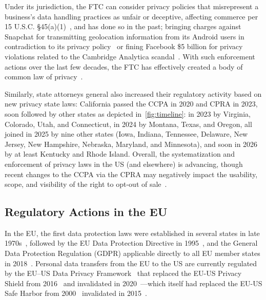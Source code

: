 Under its jurisdiction, the FTC can consider privacy policies that misrepresent a business's data handling practices as unfair or deceptive, affecting commerce per 15 U.S.C. §45(a)(1)~\cite{unitedstates:congress:houseofrepresentatives:officeofthelawrevisioncounselUnfairMethodsCompetition2023}, and has done so in the past; bringing charges against Snapchat for transmitting geolocation information from its Android users in contradiction to its privacy policy~\cite{ftcSnapchatSettlesFTC2014} or fining Facebook \$5 billion for privacy violations related to the Cambridge Analytica scandal~\cite{FTCImposes52019}. With such enforcement actions over the last few decades, the FTC has effectively created a body of common law of privacy~\cite{soloveFTCNewCommon2013}.  

Similarly, state attorneys general also increased their regulatory activity based on new privacy state laws: California passed the CCPA in 2020 and CPRA in 2023, soon followed by other states as depicted in~\autoref{fig:timeline}: in 2023 by Virginia, Colorado, Utah, and Connecticut, in 2024 by Montana, Texas, and Oregon, all joined in 2025 by nine other states (Iowa, Indiana, Tennessee, Delaware, New Jersey, New Hampshire, Nebraska, Maryland, and Minnesota), and soon in 2026 by at least Kentucky and Rhode Island. 
%
Overall, the systematization and enforcement of privacy laws in the US (and elsewhere) is advancing, though recent changes to the CCPA via the CPRA may negatively impact the usability, scope, and visibility of the right to opt-out of sale~\cite{charatanTwoStepsForward2024}.

\subsection{Regulatory Actions in the EU}
\label{sec:eu-regulations}


In the EU, the first data protection laws were established in several states in late 1970s~\cite{LoiNdeg78171978,GermanDP-1977,NorwayDP-1978}, followed by the EU Data Protection Directive in 1995~\cite{Directive199546EC}, and the General Data Protection Regulation (GDPR) applicable directly to all EU member states in 2018~\cite{Regulation2016679}.  
%
Personal data transfers from the EU to the US are currently regulated by the EU–US Data Privacy Framework~\cite{EU-US-DP-2023} that replaced the EU-US Privacy Shield from 2016~\cite{PrivacyShield-2016} and invalidated in 2020~\cite{Schrems-II}---which itself had replaced the EU-US Safe Harbor from 2000~\cite{SafeHarbor-2000} 
invalidated in 2015~\cite{Schrems-I}.

